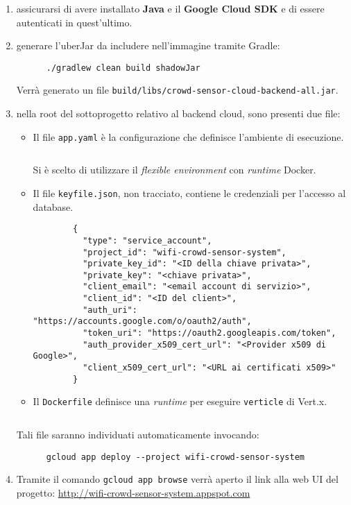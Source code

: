 \begin{enumerate}
  \item
    assicurarsi di avere installato \textbf{Java} e il \textbf{Google Cloud SDK} e di essere autenticati in quest'ultimo.
  \item
    generare l'uberJar da includere nell'immagine tramite Gradle:
    \begin{verbatim}
      ./gradlew clean build shadowJar
    \end{verbatim}
    Verrà generato un file \texttt{build/libs/crowd-sensor-cloud-backend-all.jar}.
  \item
    nella root del sottoprogetto relativo al backend cloud, sono presenti due file:
    \begin{itemize}
      \item
        Il file \texttt{app.yaml} è la configurazione che definisce l'ambiente di esecuzione.
        \inputminted[fontsize=\footnotesize,frame=lines,linenos]{yaml}{../cloud-backend/app.yaml}
        Si è scelto di utilizzare il \emph{flexible environment} con \emph{runtime} Docker.
      \item Il file \texttt{keyfile.json}, non tracciato, contiene le credenziali per l'accesso al database.
      \begin{verbatim}
        {
          "type": "service_account",
          "project_id": "wifi-crowd-sensor-system",
          "private_key_id": "<ID della chiave privata>",
          "private_key": "<chiave privata>",
          "client_email": "<email account di servizio>",
          "client_id": "<ID del client>",
          "auth_uri": "https://accounts.google.com/o/oauth2/auth",
          "token_uri": "https://oauth2.googleapis.com/token",
          "auth_provider_x509_cert_url": "<Provider x509 di Google>",
          "client_x509_cert_url": "<URL ai certificati x509>"
        }
      \end{verbatim}
      \item
        Il \texttt{Dockerfile} definisce una \emph{runtime} per eseguire \texttt{verticle} di Vert.x.
        \inputminted[fontsize=\footnotesize,frame=lines,linenos]{dockerfile}{../cloud-backend/Dockerfile}
    \end{itemize}
    Tali file saranno individuati automaticamente invocando:
    \begin{verbatim}
      gcloud app deploy --project wifi-crowd-sensor-system
    \end{verbatim}
  \item
    Tramite il comando \texttt{gcloud app browse} verrà aperto il link alla web UI del progetto:
    \url{http://wifi-crowd-sensor-system.appspot.com}
\end{enumerate}

